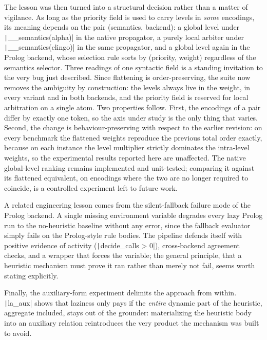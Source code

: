 The lesson was then turned into a structural decision rather than a matter of vigilance. As long as the priority field is used to carry levels in \emph{some} encodings, its meaning depends on the pair (semantics, backend): a global level under \texttt|__semantics(alpha)| in the native propagator, a purely local arbiter under \texttt|__semantics(clingo)| in the same propagator, and a global level again in the Prolog backend, whose selection rule sorts by (priority, weight) regardless of the semantics selector. Three readings of one syntactic field is a standing invitation to the very bug just described. Since flattening is order-preserving, the suite now removes the ambiguity by construction: the levels always live in the weight, in every variant and in both backends, and the priority field is reserved for local arbitration on a single atom. Two properties follow. First, the encodings of a pair differ by exactly one token, so the axis under study is the only thing that varies. Second, the change is behaviour-preserving with respect to the earlier revision: on every benchmark the flattened weights reproduce the previous total order exactly, because on each instance the level multiplier strictly dominates the intra-level weights, so the experimental results reported here are unaffected. The native global-level ranking remains implemented and unit-tested; comparing it against its flattened equivalent, on encodings where the two are no longer required to coincide, is a controlled experiment left to future work.

A related engineering lesson comes from the silent-fallback failure mode of the Prolog backend. A single missing environment variable degrades every lazy Prolog run to the no-heuristic baseline without any error, since the fallback evaluator simply fails on the Prolog-style rule bodies. The pipeline defends itself with positive evidence of activity (\texttt|decide_calls > 0|), cross-backend agreement checks, and a wrapper that forces the variable; the general principle, that a heuristic mechanism must prove it ran rather than merely not fail, seems worth stating explicitly.

Finally, the auxiliary-form experiment delimits the approach from within. \texttt|la_aux| shows that laziness only pays if the \emph{entire} dynamic part of the heuristic, aggregate included, stays out of the grounder: materializing the heuristic body into an auxiliary relation reintroduces the very product the mechanism was built to avoid.

